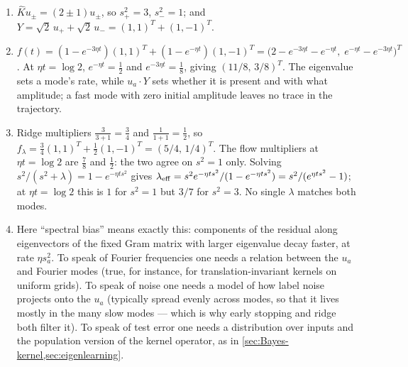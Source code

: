 \documentclass[11pt]{article}
\begin{document}
\begin{solution}
\begin{enumerate}
    \item $\hat K u_\pm = (2\pm1)u_\pm$, so $s_+^2 = 3$, $s_-^2 = 1$; and $Y = \sqrt2\,u_++\sqrt2\,u_- = (1,1)^T+(1,-1)^T$.
    \item $f(t) = (1-e^{-3\eta t})(1,1)^T+(1-e^{-\eta t})(1,-1)^T = \big(2-e^{-3\eta t}-e^{-\eta t},\; e^{-\eta t}-e^{-3\eta t}\big)^T$. At $\eta t = \log 2$, $e^{-\eta t} = \frac{1}{2}$ and $e^{-3\eta t} = \frac{1}{8}$, giving $(11/8,\,3/8)^T$. The eigenvalue sets a mode's rate, while $u_a\cdot Y$ sets whether it is present and with what amplitude; a fast mode with zero initial amplitude leaves no trace in the trajectory.
    \item Ridge multipliers $\frac{3}{3+1} = \frac{3}{4}$ and $\frac{1}{1+1} = \frac{1}{2}$, so $f_\lambda = \frac{3}{4}(1,1)^T+\frac{1}{2}(1,-1)^T = (5/4,\,1/4)^T$. The flow multipliers at $\eta t = \log2$ are $\frac{7}{8}$ and $\frac{1}{2}$: the two agree on $s^2=1$ only. Solving $s^2/(s^2+\lambda) = 1-e^{-\eta ts^2}$ gives $\lambda_{\rm eff} = s^2e^{-\eta ts^2}/(1-e^{-\eta ts^2}) = s^2/(e^{\eta ts^2}-1)$; at $\eta t=\log2$ this is $1$ for $s^2=1$ but $3/7$ for $s^2=3$. No single $\lambda$ matches both modes.
    \item Here ``spectral bias'' means exactly this: components of the residual along eigenvectors of the fixed Gram matrix with larger eigenvalue decay faster, at rate $\eta s_a^2$. To speak of Fourier frequencies one needs a relation between the $u_a$ and Fourier modes (true, for instance, for translation-invariant kernels on uniform grids). To speak of noise one needs a model of how label noise projects onto the $u_a$ (typically spread evenly across modes, so that it lives mostly in the many slow modes --- which is why early stopping and ridge both filter it). To speak of test error one needs a distribution over inputs and the population version of the kernel operator, as in \cref{sec:Bayes-kernel,sec:eigenlearning}.
\end{enumerate}
\end{solution}
\end{document}

